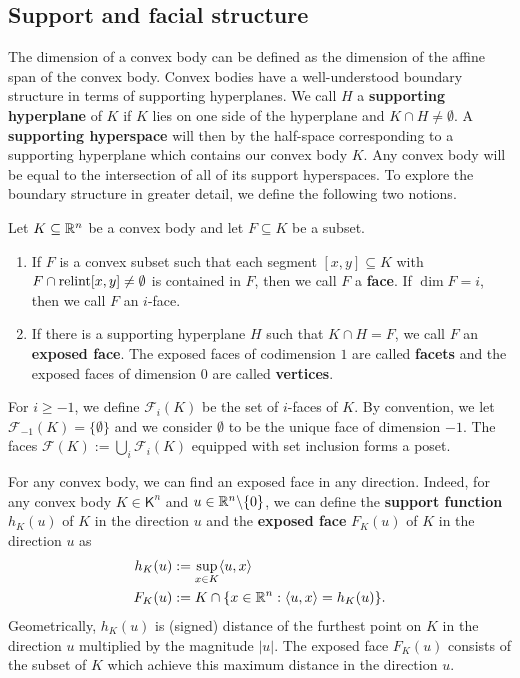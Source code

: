 \documentclass{puthesis-UG}
\begin{document}
\subsection{Support and facial structure}

The dimension of a convex body can be defined as the dimension of the affine span of the convex body. Convex bodies have a well-understood boundary structure in terms of supporting hyperplanes. We call $H$ a \textbf{supporting hyperplane} of $K$ if $K$ lies on one side of the hyperplane and $K \cap H \neq \emptyset$. A \textbf{supporting hyperspace} will then by the half-space corresponding to a supporting hyperplane which contains our convex body $K$. Any convex body will be equal to the intersection of all of its support hyperspaces. To explore the boundary structure in greater detail, we define the following two notions. 
\begin{defn} \label{face-and-exposed-face}
	Let $K \subseteq \mathbb{R}^n$ be a convex body and let $F \subseteq K$ be a subset. 
	\begin{enumerate}[label = (\alph*)]
		\item If $F$ is a convex subset such that each segment $[x, y] \subseteq K$ with $F \cap \operatorname{relint} [x, y] \neq \emptyset$ is contained in $F$, then we call $F$ a \textbf{face}. If $\dim F = i$, then we call $F$ an $i$-face. 

		\item If there is a supporting hyperplane $H$ such that $K \cap H = F$, we call $F$ an \textbf{exposed face}. The exposed faces of codimension $1$ are called \textbf{facets} and the exposed faces of dimension $0$ are called \textbf{vertices}. 
	\end{enumerate}
	For $i \geq -1$, we define $\mathcal{F}_i(K)$ be the set of $i$-faces of $K$. By convention, we let $\mathcal{F}_{-1}(K) = \{\emptyset\}$ and we consider $\emptyset$ to be the unique face of dimension $-1$. The faces $\mathcal{F}(K) := \bigcup_i \mathcal{F}_i(K)$ equipped with set inclusion forms a poset. 
\end{defn}

For any convex body, we can find an exposed face in any direction. Indeed, for any convex body $K \in \mathsf{K}^n$ and $u \in \mathbb{R}^n \backslash \{0\}$, we can define the \textbf{support function} $h_K(u)$ of $K$ in the direction $u$ and the \textbf{exposed face} $F_K(u)$ of $K$ in the direction $u$ as 
\begin{align*}
	h_K(u) & := \sup_{x \in K} \langle u, x \rangle \\
	F_K(u) & := K \cap \{x \in \mathbb{R}^n : \langle u, x \rangle = h_K(u)\}.
\end{align*}
Geometrically, $h_K(u)$ is (signed) distance of the furthest point on $K$ in the direction $u$ multiplied by the magnitude $|u|$. The exposed face $F_K(u)$ consists of the subset of $K$ which achieve this maximum distance in the direction $u$. 
\end{document}
